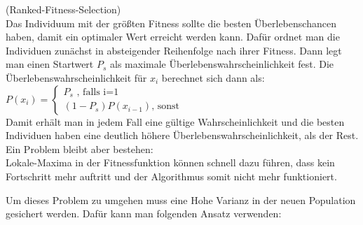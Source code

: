 \begin{algo}(Ranked-Fitness-Selection)\\
	Das Individuum mit der größten Fitness sollte die besten Überlebenschancen haben, damit ein optimaler Wert erreicht werden kann. Dafür ordnet man die Individuen zunächst in absteigender Reihenfolge nach ihrer Fitness. Dann legt man einen Startwert $P_s$ als maximale Überlebenswahrscheinlichkeit fest. Die Überlebenswahrscheinlichkeit für $x_i$ berechnet sich dann als:\\
	$P(x_i)=\begin{cases}
	P_s\text{\ \ \ \ \ \ \ \ \ \ \ \ \ \ \ \ \ , falls i=1}\\
	(1-P_s)P(x_{i-1})\text{, sonst}
	\end{cases}$\\
	Damit erhält man in jedem Fall eine gültige Wahrscheinlichkeit und die besten Individuen haben eine deutlich höhere Überlebenswahrscheinlichkeit, als der Rest.\\
	Ein Problem bleibt aber bestehen: \\
	Lokale-Maxima in der Fitnessfunktion können schnell dazu führen, dass kein Fortschritt mehr auftritt und der Algorithmus somit nicht mehr funktioniert.
\end{algo}
\noindent Um dieses Problem zu umgehen muss eine Hohe Varianz in der neuen Population gesichert werden. Dafür kann man folgenden Ansatz verwenden:
